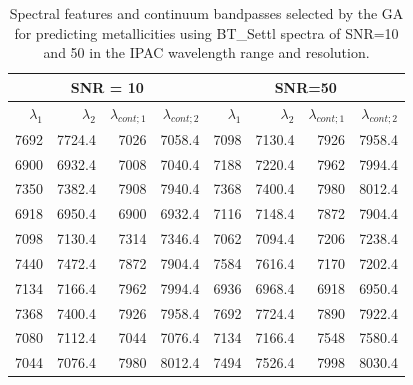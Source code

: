 \begin{table}
\begin{center}
\begin{tabular}{rrrr | rrrr}
  \hline
 \multicolumn{4}{c}{SNR = 10} &  \multicolumn{4}{c}{SNR=50} \\
  \hline
$\lambda_1$ & $\lambda_2$ & $\lambda_{cont;1}$ & $\lambda_{cont;2} $ & $\lambda_1$ & $\lambda_2$ & $\lambda_{cont;1}$ & $\lambda_{cont;2} $ \\ 
  \hline
7692 & 7724.4 &	7026 & 7058.4  &  7098 & 7130.4 & 7926 & 7958.4 \\
6900 & 6932.4 &	7008 & 7040.4  &  7188 & 7220.4 & 7962 & 7994.4  \\
7350 & 7382.4 &	7908 & 7940.4  &  7368 & 7400.4 & 7980 & 8012.4  \\
6918 & 6950.4 &	6900 & 6932.4  &  7116 & 7148.4 & 7872 & 7904.4  \\
7098 & 7130.4 &	7314 & 7346.4  &  7062 & 7094.4 & 7206 & 7238.4  \\
7440 & 7472.4 &	7872 & 7904.4  &  7584 & 7616.4 & 7170 & 7202.4  \\
7134 & 7166.4 &	7962 & 7994.4  &  6936 & 6968.4 & 6918 & 6950.4  \\
7368 & 7400.4 &	7926 & 7958.4  &  7692 & 7724.4 & 7890 & 7922.4  \\
7080 & 7112.4 &	7044 & 7076.4  &  7134 & 7166.4 & 7548 & 7580.4  \\
7044 & 7076.4 &	7980 & 8012.4  &  7494 & 7526.4 & 7998 & 8030.4  \\
\hline
\end{tabular}
\caption {Spectral features and continuum bandpasses selected by the
  GA for predicting metallicities using BT\_Settl spectra of SNR=10
  and 50 in the IPAC wavelength range and
  resolution.} \label{tab:ipac-met-noisy}
\end{center}
\end{table}

